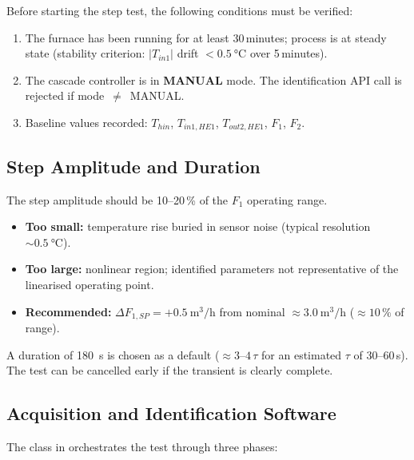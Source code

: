 Before starting the step test, the following conditions must be verified:

\begin{enumerate}[leftmargin=*, itemsep=3pt]
  \item The furnace has been running for at least 30\,minutes; process is at steady state
    (stability criterion: $|T_{in1}|$ drift $<\SI{0.5}{\degreeCelsius}$ over
    5\,minutes).
  \item The cascade controller is in \textbf{MANUAL} mode. The identification API call
    is rejected if mode~$\neq$~MANUAL.
  \item Baseline values recorded: $T_{hin}$, $T_{in1,HE1}$, $T_{out2,HE1}$, $F_1$, $F_2$.
\end{enumerate}

\subsection{Step Amplitude and Duration}

The step amplitude should be 10--20\,\% of the $F_1$ operating range.

\begin{itemize}[leftmargin=*, itemsep=3pt]
  \item \textbf{Too small:} temperature rise buried in sensor noise
    (typical resolution $\sim\SI{0.5}{\degreeCelsius}$).
  \item \textbf{Too large:} nonlinear region; identified parameters not representative of
    the linearised operating point.
  \item \textbf{Recommended:} $\Delta F_{1,SP} = +\SI{0.5}{\metre\cubed\per\hour}$
    from nominal $\approx \SI{3.0}{\metre\cubed\per\hour}$ ($\approx 10\,\%$ of range).
\end{itemize}

A duration of \SI{180}{\second} is chosen as a default ($\approx 3$--$4\,\tau$ for an
estimated $\tau$ of 30--60\,s). The test can be cancelled early if the transient is
clearly complete.

\subsection{Acquisition and Identification Software}

The  class in  orchestrates the test
through three phases:

